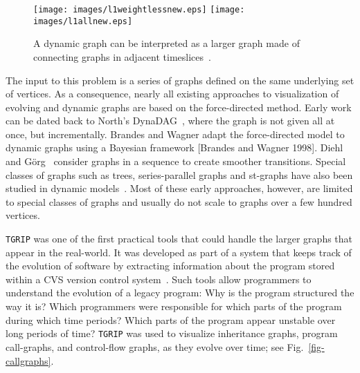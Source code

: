 \documentclass[notitlepage,letter,11pt]{article}
\begin{document}
\begin{figure*}[t]
\begin{center}
\texttt{[image: images/l1weightlessnew.eps]}
\texttt{[image: images/l1allnew.eps]}
\end{center}
\caption {\small\sf A dynamic graph can be interpreted as a larger graph made
  of connecting graphs in adjacent timeslices~\cite{ehkwy}.
}
\label{fd:fig:dyn}
\end{figure*}

The input to this problem is a series of graphs defined on the same underlying set of vertices. As a consequence, nearly all existing approaches to
visualization of evolving and dynamic graphs are based on the
force-directed method. Early work can be dated back to North's DynaDAG~\cite{North:1996:ILD},
where the graph is not given all at once, but incrementally. Brandes
and Wagner adapt the force-directed model to dynamic graphs using a
Bayesian framework [Brandes and Wagner 1998]. Diehl and
G\"org~\cite{Diehl:2002:GTC} consider graphs in a sequence to create
smoother transitions. Special classes of graphs such as trees,
series-parallel graphs and st-graphs have also been studied in dynamic
models~\cite{cdtt-dgdts-95,SCG92*261,Moen:1990:DDT}.	Most of these
early approaches, however, are limited to special classes of graphs
and usually do not scale to graphs over a few hundred vertices. 

{\tt TGRIP} was one of the first practical tools that could handle the larger graphs that
appear in the real-world. It was developed as part of a system that
keeps track of the evolution of software by extracting
information about the program stored within a CVS version control
system~\cite{ck-sgbv-03}. Such tools allow programmers to understand
the evolution of a legacy program: Why is the program structured the
way it is? Which programmers were responsible for which parts of the
program during which time periods? Which parts of the program appear
unstable over long periods of time? {\tt TGRIP} was used to visualize inheritance graphs, program call-graphs, and
control-flow graphs, as they evolve over time; see
Fig.~\ref{fig-callgraphs}. 
\end{document}
